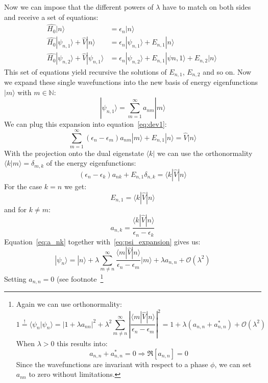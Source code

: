 Now we can impose that the different powers of $\lambda$ have to
match on both sides and receive a set of equations:
\begin{align}
    \hat{H_0} |n\rangle &= \epsilon_n |n\rangle\\
    \hat{H_0} |\psi_{n,1}\rangle + \hat{V}|n\rangle &=
    \epsilon_n |\psi_{n,1}\rangle + E_{n,1}|n\rangle \label{eq:dev1}\\
    \hat{H_0} |\psi_{n,2}\rangle + \hat{V}|\psi_{n,1}\rangle &=
    \epsilon_n |\psi_{n,2}\rangle + E_{n,1}|\psi{n,1}\rangle 
    + E_{n,2}|n\rangle \label{eq:dev2}\
\end{align}
This set of equations yield recursive the solutions of $E_{n,1}$,
$E_{n,2}$ and so on. Now we expand these single wavefunctions 
into the new basis of energy eigenfunctions $|m \rangle$ with $m\in 
\mathbb{N}$:
\begin{equation}
    |\psi_{n,1}\rangle = \sum_{m=1}^{\infty} a_{nm} |m \rangle
    \label{eq:psi_expansion}
\end{equation}
We can plug this expansion into equation~\eqref{eq:dev1}:
\begin{equation}
    \sum_{m=1}^{\infty} (\epsilon_n - \epsilon_m) a_{nm} |m\rangle
    + E_{n,1} |n\rangle = \hat{V}|n \rangle
\end{equation}
With the projection onto the dual eigenstate $\langle k|$ we can
use the orthonormality $\langle k | m \rangle = \delta_{m,k}$ 
of the energy eigenfunctions:
\begin{equation}
     (\epsilon_n - \epsilon_k) a_{nk} 
     + E_{n,1}\delta_{n,k}  = \langle k |\hat{V}|n \rangle
\end{equation}
For the case $k = n$ we get:
\begin{equation}
    E_{n,1} = \langle k |\hat{V}|n \rangle
\end{equation}
and for $k\neq m$:
\begin{equation}
    a_{n,k} = \frac{\langle k |\hat{V}|n \rangle}
    {\epsilon_n - \epsilon_k} \label{eq:a_nk}
\end{equation}
Equation~\eqref{eq:a_nk} together with~\eqref{eq:psi_expansion} 
gives us:
\begin{equation}
    |\psi_{n}\rangle = |n\rangle + \lambda \sum_{m\neq n}^{\infty}
    \frac{\langle m |\hat{V}|n \rangle}{\epsilon_n - \epsilon_m}  
    |m \rangle + \lambda a_{n,n} + \mathcal{O}(\lambda^2)
\end{equation}
Setting $a_{n,n}=0$ (see footnote~\footnote{
Again we can use orthonormality:
\begin{equation*}
    1\overset{!}{=} \langle \psi_n|\psi_{n}\rangle 
    = \left | 1 + \lambda a_{nn} \right |^2 + \lambda^2
    \sum_{m\neq n}^{\infty}
    \left | \frac{\langle m |\hat{V}|n \rangle}
        {\epsilon_n - \epsilon_m} \right |^2 = 
    1 + \lambda (a_{n,n} + a^*_{n,n}) + \mathcal{O}(\lambda^2)
\end{equation*}
When $\lambda > 0 $ this results into:
\begin{equation*}
    a_{n,n} + a^*_{n,n} = 0 \Rightarrow \Re  [a_{n,n}] = 0
\end{equation*}
Since the wavefunctions 
are invariant with respect to a phase $\phi$,
we can set $a_{nn}$ to zero without limitations.} 
